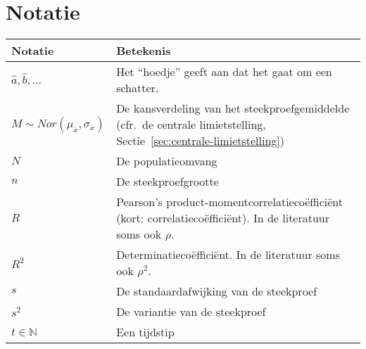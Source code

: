 \chapter{Notatie}
\label{app:notatie}

\begin{table}
  \centering
  \begin{tabular}{p{}p{}}
  	\toprule
  	\textbf{Notatie}                                        & \textbf{Betekenis}                                                                                                                     \\
  	\midrule
  	$\widehat{a}, \widehat{b}, \ldots$                      & Het ``hoedje'' geeft aan dat het gaat om een schatter.                                                                                 \\
  	$M \sim Nor(\mu_{\overline{x}}, \sigma_{\overline{x}})$ & De kansverdeling van het steekproefgemiddelde (cfr.~de centrale limietstelling, Sectie~\ref{sec:centrale-limietstelling})              \\
  	$N$                                                     & De populatieomvang                                                                                                                     \\
  	$n$                                                     & De steekproefgrootte                                                                                                                   \\
  	$R$                                                     & Pearson's product-momentcorrelatiecoëfficiënt (kort: correlatiecoëfficiënt). In de literatuur soms ook $\rho$.                         \\
  	$R^2$                                                   & Determinatiecoëfficiënt. In de literatuur soms ook $\rho^2$.                                                                           \\
  	$s$                                                     & De standaardafwijking van de steekproef                                                                                                \\
  	$s^2$                                                   & De variantie van de steekproef                                                                                                         \\
  	$t \in \mathbb{N}$                                      & Een tijdstip                                                                                                                           \\

\end{tabular}
\end{table}
